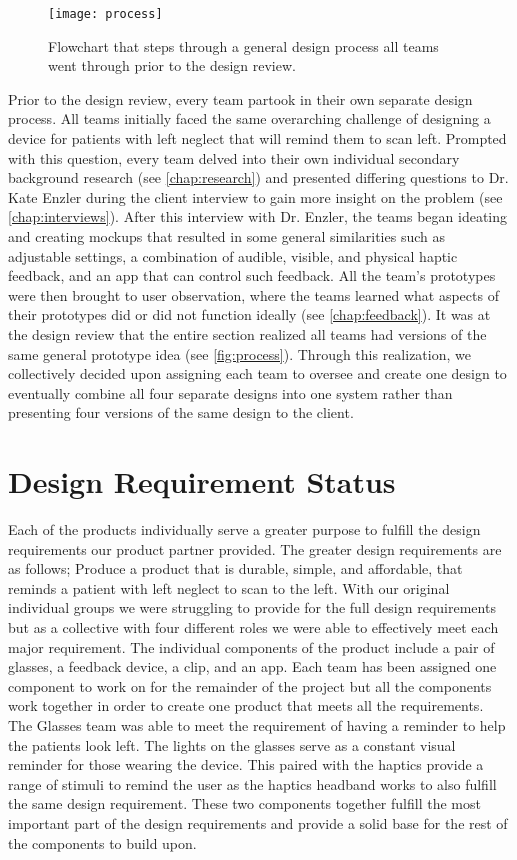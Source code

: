 \begin{figure}[h]
  \centering
  \texttt{[image: process]}
  \caption{Flowchart that steps through a general design process all teams went
    through prior to the design review.}
  \label{fig:process}
\end{figure}

Prior to the design review, every team partook in their own separate design
process. All teams initially faced the same overarching challenge of designing a
device for patients with left neglect that will remind them to scan
left. Prompted with this question, every team delved into their own individual
secondary background research (see \autoref{chap:research}) and presented differing
questions to Dr. Kate Enzler during the client interview to gain more insight on
the problem (see \autoref{chap:interviews}). After this interview with
Dr. Enzler, the teams began ideating and creating mockups that resulted in some
general similarities such as adjustable settings, a combination of audible,
visible, and physical haptic feedback, and an app that can control such
feedback. All the team’s prototypes were then brought to user observation, where
the teams learned what aspects of their prototypes did or did not function
ideally (see \autoref{chap:feedback}). It was at the design review that the entire
section realized all teams had versions of the same general prototype idea
(see \autoref{fig:process}).
Through this realization, we collectively decided upon assigning each
team to oversee and create one design to eventually combine all four separate
designs into one system rather than presenting four versions of the same design
to the client. 

\section{Design Requirement Status}

Each of the products individually serve a greater purpose to fulfill the design
requirements our product partner provided. The greater design requirements are
as follows; Produce a product that is durable, simple, and affordable, that
reminds a patient with left neglect to scan to the left. With our original
individual groups we were struggling to provide for the full design requirements
but as a collective with four different roles we were able to effectively meet
each major requirement. The individual components of the product include a pair
of glasses, a feedback device, a clip, and an app. Each team has been assigned
one component to work on for the remainder of the project but all the components
work together in order to create one product that meets all the
requirements. The Glasses team was able to meet the requirement of having a
reminder to help the patients look left. The lights on the glasses serve as a
constant visual reminder for those wearing the device. This paired with the
haptics provide a range of stimuli to remind the user as the haptics headband
works to also fulfill the same design requirement. These two components together
fulfill the most important part of the design requirements and provide a solid
base for the rest of the components to build upon. 

